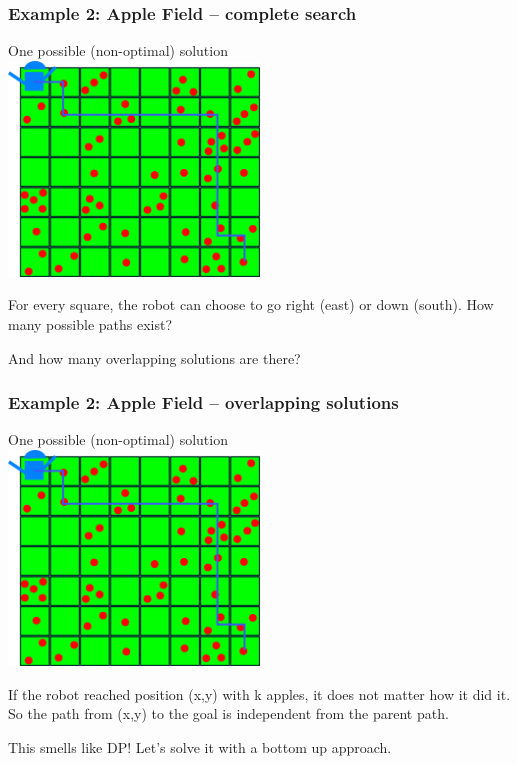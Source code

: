 \documentclass{beamer}
\begin{document}
\begin{frame}
  \frametitle{Example 2: Apple Field -- complete search}
  \begin{center}
    {\smaller One possible (non-optimal) solution}\\
    \includegraphics[width=0.5\textwidth]{../img/applefield-solution}
  \end{center}

  For every square, the robot can choose to go right (east) or down
  (south). How many possible paths exist?

  \bigskip

  And how many overlapping solutions are there?
\end{frame}

\begin{frame}
  \frametitle{Example 2: Apple Field -- overlapping solutions}
  \begin{center}
    {\smaller One possible (non-optimal) solution}\\
    \includegraphics[width=0.5\textwidth]{../img/applefield-solution}
  \end{center}

  If the robot reached position (x,y) with k apples, it does not
  matter how it did it. So the path from (x,y) to the goal is independent from 
  the parent path.

  This smells like DP! Let's solve it with a bottom up approach.
\end{frame}
\end{document}
